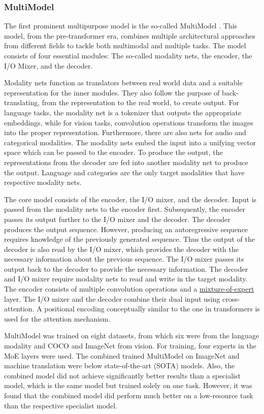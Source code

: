 \documentclass[
]{krantz}
\begin{document}
\hypertarget{multimodel}{%
\subsubsection{MultiModel}\label{multimodel}}

The first prominent multipurpose model is the so-called MultiModel \citep{Kaiser2017}. This model, from the pre-transformer era, combines multiple architectural approaches
from different fields to tackle both multimodal and multiple tasks. The model consists of four essential modules: The so-called modality nets, the encoder, the I/O Mixer, and the decoder.

Modality nets function as translators between real world data and a suitable representation for the inner modules. They also follow the purpose of back-translating,
from the representation to the real world, to create output. For language tasks, the modality net is a tokenizer that outputs the appropriate embeddings, while for vision tasks,
convolution operations transform the images into the proper representation. Furthermore, there are also nets for audio and categorical modalities. The modality nets embed the input
into a unifying vector space which can be passed to the encoder. To produce the output, the representations from the decoder are fed into another modality net to produce the output.
Language and categories are the only target modalities that have respective modality nets.

The core model consists of the encoder, the I/O mixer, and the decoder. Input is passed from the modality nets to the encoder first. Subsequently, the encoder passes its output further
to the I/O mixer and the decoder. The decoder produces the output sequence. However, producing an autoregressive sequence requires knowledge of the previously generated sequence. Thus
the output of the decoder is also read by the I/O mixer, which provides the decoder with the necessary information about the previous sequence. The I/O mixer passes its output back to the
decoder to provide the necessary information. The decoder and I/O mixer require modality nets to read and write in the target modality. The encoder consists of multiple convolution operations
and a \protect\hyperlink{03-03-MoE}{mixture-of-expert} layer. The I/O mixer and the decoder combine their dual input using cross-attention. A positional encoding conceptually similar to the one in transformers \citep{vaswani2017attention}
is used for the attention mechanism.

MultiModel was trained on eight datasets, from which six were from the language modality and COCO \citep{mccoco} and ImageNet \citep{ImageNet} from vision. For training, four experts in the MoE layers
were used. The combined trained MultiModel on ImageNet and machine translation were below state-of-the-art (SOTA) models. Also, the combined model did not achieve significantly better results
than a specialist model, which is the same model but trained solely on one task. However, it was found that the combined model did perform much better on a low-resource task than the respective
specialist model.
\end{document}
